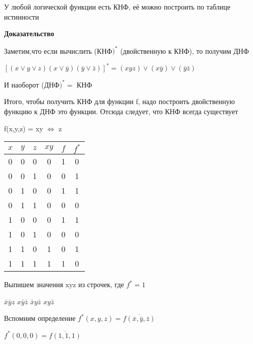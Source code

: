 \documentclass[russian]{lecture-notes}
\begin{document}
	\begin{definition}
		У любой логической функции есть КНФ, её можно построить по таблице истинности
		\end{definition}

	\textbf{Доказательство}

		Заметим,что если вычислить (КНФ$)^{*}$ (двойственную к КНФ), то получим ДНФ

	\begin{example}
	$[(x \vee y \vee z)(x \vee \bar{y})(\bar{y} \vee \bar{z})]^{*} = (xyz)\vee(x\bar{y})\vee(\bar{y}\bar{z})$

		И наоборот (ДНФ$)^{*} = $ КНФ
		\end{example}

	Итого, чтобы получить КНФ для функции f, надо построить двойственную функцию
	к ДНФ это функции. Отсюда следует, что КНФ всегда существует

	\begin{example}
		f(x,y,z) = xy $\Leftrightarrow$ z

		\begin{table}[h!]
	\centering
	\begin{tabular}{|c|c|c|c|c|c|}
		\hline
		$x$ & $y$ & $z$ & $xy$ & $f$ & $f^{*}$ \\ \hline
		0 & 0 & 0 & 0   & 1   & 0   \\ \hline
		0 & 0 & 1 & 0   & 0   & 1   \\ \hline
		0 & 1 & 0 & 0   & 1   & 1   \\ \hline
		0 & 1 & 1 & 0   & 0   & 0   \\ \hline
		1 & 0 & 0 & 0   & 1   & 1   \\ \hline
		1 & 0 & 1 & 0   & 0   & 0   \\ \hline
		1 & 1 & 0 & 1   & 0   & 1   \\ \hline
		1 & 1 & 1 & 1   & 1   & 0   \\ \hline
	\end{tabular}

\end{table}


			Выпишем значения xyz из строчек, где $f^{*} = 1$

			$\bar{x}\bar{y}z$ \quad $x\bar{y}\bar{z}$ \quad $\bar{x}y\bar{z}$ \quad $xy\bar{z}$


		\end{example}

	Вспомним определение $f^{*}(x,y,z) = \overline{f(\bar{x},\bar{y},\bar{z})}$

	$f^{*}(0,0,0) = \overline{f(1,1,1)}$
\end{document}
